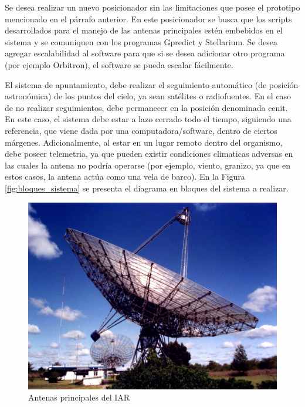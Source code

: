 \documentclass[11pt, %
codirector, %
]{charter}
\begin{document}
Se desea realizar un nuevo posicionador sin las limitaciones que posee el prototipo mencionado en el párrafo anterior. En este posicionador se busca que los scripts desarrollados para el manejo de las antenas principales estén embebidos en el sistema y se comuniquen con los programas Gpredict y Stellarium. Se desea agregar escalabilidad al software para que si se desea adicionar otro programa (por ejemplo Orbitron), el software se pueda escalar fácilmente.      

El sistema de apuntamiento, debe realizar el seguimiento automático (de posición astronómica) de los puntos del cielo, ya sean satélites o radiofuentes. En el caso de no realizar seguimientos, debe permanecer en la posición denominada cenit. En este caso, el sistema debe estar a lazo cerrado todo el tiempo, siguiendo una referencia, que viene dada por una computadora/software, dentro de ciertos márgenes. 
Adicionalmente, al estar en un lugar remoto dentro del organismo, debe poseer telemetria, ya que pueden existir condiciones climaticas adversas en las cuales la antena no podría operarse (por ejemplo, viento, granizo, ya que en estos casos, la antena actúa como una vela de barco). En la Figura \ref{fig:bloques_sistema}  se presenta el diagrama en bloques del sistema a realizar. 

\begin{figure}[h]
	\vspace{-0.05cm}
	\centering
	\includegraphics[scale = 0.2]{Figuras/seccion_1/antena_main.jpg}
	\caption{Antenas principales del IAR}
	\label{fig:antenas_main}
\end{figure}
\end{document}
